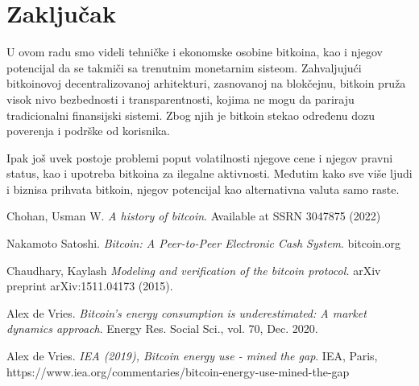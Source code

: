 \documentclass[a4paper]{article}
\begin{document}
\section{Zaključak}

U ovom radu smo videli tehničke i ekonomske osobine bitkoina, kao i njegov potencijal da se takmiči sa trenutnim monetarnim sisteom.
Zahvaljujući  bitkoinovoj decentralizovanoj arhitekturi, zasnovanoj na blokčejnu, bitkoin pruža visok nivo bezbednosti i transparentnosti, kojima ne mogu da pariraju tradicionalni finansijski sistemi. Zbog njih je bitkoin stekao određenu dozu poverenja i podrške od korisnika.

Ipak još uvek postoje problemi poput volatilnosti njegove cene i njegov pravni status, kao i upotreba bitkoina za ilegalne aktivnosti.
Međutim kako sve više ljudi i biznisa prihvata bitkoin, njegov potencijal kao alternativna valuta samo raste.

\clearpage

\appendix

\begin{thebibliography}{9}


 Chohan, Usman W. \emph{A history of bitcoin}. Available at SSRN 3047875 (2022)

 Nakamoto Satoshi. \emph{Bitcoin: A Peer-to-Peer Electronic Cash System}. bitcoin.org

 Chaudhary, Kaylash \emph{Modeling and verification of the bitcoin protocol.} arXiv preprint arXiv:1511.04173 (2015).

 Alex de Vries. \emph{Bitcoin’s energy consumption is underestimated: A market dynamics approach}. Energy Res. Social Sci., vol. 70, Dec. 2020.

 Alex de Vries. \emph{IEA (2019), Bitcoin energy use - mined the gap}.  IEA, Paris, https://www.iea.org/commentaries/bitcoin-energy-use-mined-the-gap 



\end{thebibliography}
\end{document}
